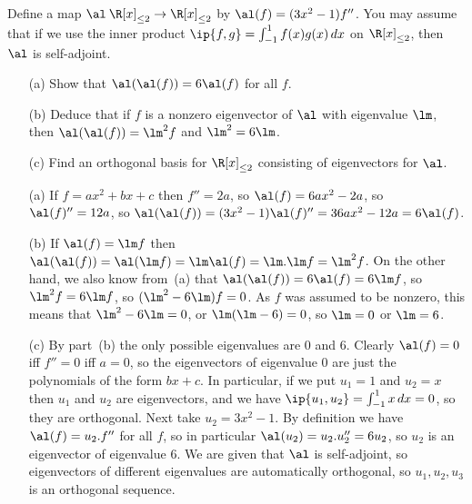 \begin{exercise}
 Define a map $\al\:\R[x]_{\leq 2}\to\R[x]_{\leq 2}$ by
 $\al(f)=(3x^2-1)f''$.  You may assume that if we use the inner
 product $\ip{f,g}=\int_{-1}^1 f(x)g(x)\,dx$ on $\R[x]_{\leq 2}$, then
 $\al$ is self-adjoint.
 \begin{itemize}
  \item[(a)] Show that $\al(\al(f))=6\al(f)$ for all $f$.
  \item[(b)] Deduce that if $f$ is a nonzero eigenvector of $\al$ with
   eigenvalue $\lm$, then $\al(\al(f))=\lm^2f$ and $\lm^2=6\lm$.
  \item[(c)] Find an orthogonal basis for $\R[x]_{\leq 2}$ consisting
   of eigenvectors for $\al$.
 \end{itemize}
\end{exercise}
\begin{solution}
 \begin{itemize}
  \item[(a)] If $f=ax^2+bx+c$ then $f''=2a$, so $\al(f)=6ax^2-2a$, so
   $\al(f)''=12a$, so
   $\al(\al(f))=(3x^2-1)\al(f)''=36ax^2-12a=6\al(f)$.
  \item[(b)] If $\al(f)=\lm f$ then
   $\al(\al(f))=\al(\lm f)=\lm\al(f)=\lm.\lm f=\lm^2 f$.  On the other
   hand, we also know from~(a) that $\al(\al(f))=6\al(f)=6\lm f$, so
   $\lm^2 f=6\lm f$, so $(\lm^2-6\lm)f=0$.  As $f$ was assumed to be
   nonzero, this means that $\lm^2-6\lm=0$, or $\lm(\lm-6)=0$, so
   $\lm=0$ or $\lm=6$.
  \item[(c)] By part~(b) the only possible eigenvalues are $0$ and
   $6$.  Clearly $\al(f)=0$ iff $f''=0$ iff $a=0$, so the eigenvectors
   of eigenvalue $0$ are just the polynomials of the form $bx+c$.
   In particular, if we put $u_1=1$ and $u_2=x$ then $u_1$ and $u_2$
   are eigenvectors, and we have $\ip{u_1,u_2}=\int_{-1}^1 x\,dx=0$,
   so they are orthogonal.  Next take $u_2=3x^2-1$.  By definition
   we have $\al(f)=u_2.f''$ for all $f$, so in particular
   $\al(u_2)=u_2.u_2''=6u_2$, so $u_2$ is an eigenvector of eigenvalue
   $6$.  We are given that $\al$ is self-adjoint, so eigenvectors of
   different eigenvalues are automatically orthogonal, so
   $u_1,u_2,u_3$ is an orthogonal sequence.  
 \end{itemize}
\end{solution}

